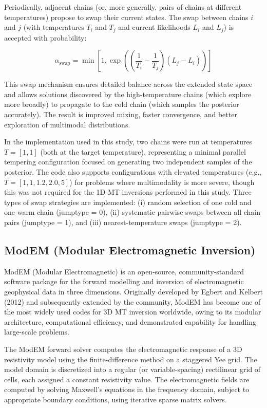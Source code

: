 Periodically, adjacent chains (or, more generally, pairs of chains at different temperatures) propose to swap their current states. The swap between chains $i$ and $j$ (with temperatures $T_i$ and $T_j$ and current likelihoods $L_i$ and $L_j$) is accepted with probability:

\begin{equation}
\alpha_{\text{swap}} = \min\left[1, \exp\left(\left(\frac{1}{T_i} - \frac{1}{T_j}\right)(L_j - L_i)\right)\right]
\end{equation}

This swap mechanism ensures detailed balance across the extended state space and allows solutions discovered by the high-temperature chains (which explore more broadly) to propagate to the cold chain (which samples the posterior accurately). The result is improved mixing, faster convergence, and better exploration of multimodal distributions.

In the implementation used in this study, two chains were run at temperatures $T = [1, 1]$ (both at the target temperature), representing a minimal parallel tempering configuration focused on generating two independent samples of the posterior. The code also supports configurations with elevated temperatures (e.g., $T = [1, 1, 1.2, 2.0, 5]$) for problems where multimodality is more severe, though this was not required for the 1D MT inversions performed in this study. Three types of swap strategies are implemented: (i) random selection of one cold and one warm chain (jumptype = 0), (ii) systematic pairwise swaps between all chain pairs (jumptype = 1), and (iii) nearest-temperature swaps (jumptype = 2).

\subsection{ModEM (Modular Electromagnetic Inversion)}

ModEM (Modular Electromagnetic) is an open-source, community-standard software package for the forward modelling and inversion of electromagnetic geophysical data in three dimensions. Originally developed by Egbert and Kelbert (2012) and subsequently extended by the community, ModEM has become one of the most widely used codes for 3D MT inversion worldwide, owing to its modular architecture, computational efficiency, and demonstrated capability for handling large-scale problems.

The ModEM forward solver computes the electromagnetic response of a 3D resistivity model using the finite-difference method on a staggered Yee grid. The model domain is discretized into a regular (or variable-spacing) rectilinear grid of cells, each assigned a constant resistivity value. The electromagnetic fields are computed by solving Maxwell's equations in the frequency domain, subject to appropriate boundary conditions, using iterative sparse matrix solvers.

